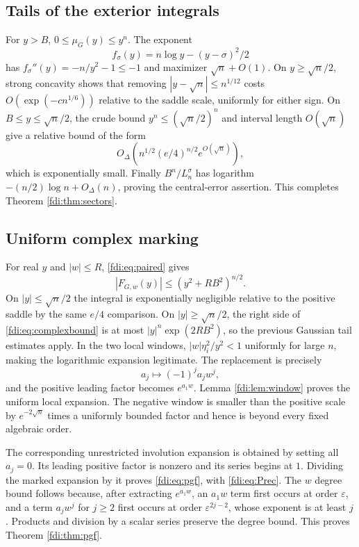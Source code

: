 \documentclass[11pt,letterpaper]{article}
\theoremstyle{remark}\newtheorem{remark}[theorem]{Remark}
\newcommand{\eps}{\varepsilon}\newcommand{\Pois}{\operatorname{Poisson}}
\begin{document}
\subsection{Tails of the exterior integrals}
For $y>B$, $0\le\mu_G(y)\le y^n$. The exponent
\[
 f_\sigma(y)=n\log y-(y-\sigma)^2/2
\]
has $f_\sigma''(y)=-n/y^2-1\le-1$ and maximizer $\sqrt n+O(1)$. On $y\ge\sqrt n/2$, strong concavity shows that removing $|y-\sqrt n|\le n^{1/12}$ costs $O(\exp(-c n^{1/6}))$ relative to the saddle scale, uniformly for either sign. On $B\le y\le\sqrt n/2$, the crude bound $y^n\le(\sqrt n/2)^n$ and interval length $O(\sqrt n)$ give a relative bound of the form
\[
 O_\Delta\!\left(n^{1/2}(e/4)^{n/2}e^{O(\sqrt n)}\right),
\]
which is exponentially small. Finally $B^n/L_n^\sigma$ has logarithm $-(n/2)\log n+O_\Delta(n)$, proving the central-error assertion. This completes Theorem \ref{fdi:thm:sectors}.

\subsection{Uniform complex marking}
For real $y$ and $|w|\le R$, \eqref{fdi:eq:paired} gives
\begin{equation}\label{fdi:eq:complexbound}
 |F_{G,w}(y)|\le(y^2+RB^2)^{n/2}.
\end{equation}
On $|y|\le\sqrt n/2$ the integral is exponentially negligible relative to the positive saddle by the same $e/4$ comparison. On $|y|\ge\sqrt n/2$, the right side of \eqref{fdi:eq:complexbound} is at most
$|y|^n\exp(2RB^2)$, so the previous Gaussian tail estimates apply. In the two local windows, $|w|\eta_i^2/y^2<1$ uniformly for large $n$, making the logarithmic expansion legitimate. The replacement is precisely
\[
 a_j\longmapsto(-1)^ja_jw^j,
\]
and the positive leading factor becomes $e^{a_1w}$. Lemma \ref{fdi:lem:window} proves the uniform local expansion. The negative window is smaller than the positive scale by $e^{-2\sqrt n}$ times a uniformly bounded factor and hence is beyond every fixed algebraic order.

The corresponding unrestricted involution expansion is obtained by setting all $a_j=0$. Its leading positive factor is nonzero and its series begins at $1$. Dividing the marked expansion by it proves \eqref{fdi:eq:pgf}, with \eqref{fdi:eq:Prec}. The $w$ degree bound follows because, after extracting $e^{a_1w}$, an $a_1w$ term first occurs at order $\eps$, and a term $a_jw^j$ for $j\ge2$ first occurs at order $\eps^{2j-2}$, whose exponent is at least $j$. Products and division by a scalar series preserve the degree bound. This proves Theorem \ref{fdi:thm:pgf}.
\end{document}
